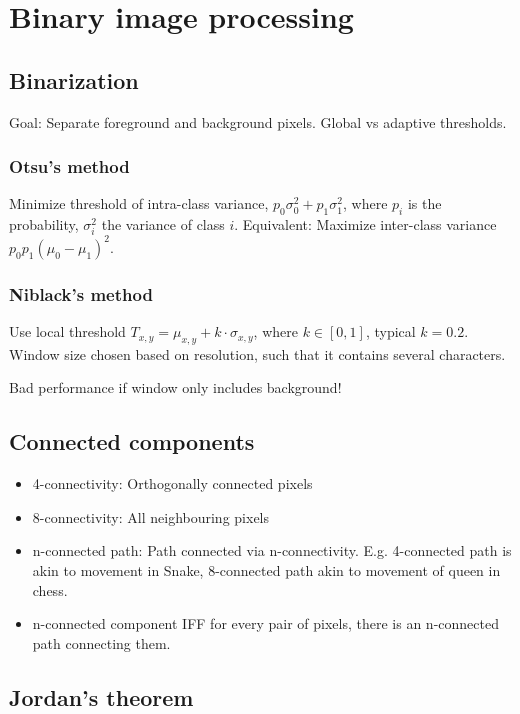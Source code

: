 \section{Binary image processing}

\subsection{Binarization}

Goal: Separate foreground and background pixels. Global vs adaptive thresholds.

\subsubsection{Otsu's method}

Minimize threshold of intra-class variance, $p_0 \sigma_0^2 + p_1 \sigma_1^2$,
where $p_i$ is the probability, $\sigma_i^2$ the variance of class $i$.
Equivalent: Maximize inter-class variance $p_0 p_1 (\mu_0 - \mu_1)^2$.

\subsubsection{Niblack's method}

Use local threshold $T_{x, y} = \mu_{x, y} + k \cdot \sigma_{x, y}$, where $k
\in [0, 1]$, typical $k = 0.2$. Window size chosen based on resolution, such
that it contains several characters.

Bad performance if window only includes background!

\subsection{Connected components}

\begin{itemize}
		\item 4-connectivity: Orthogonally connected pixels
		\item 8-connectivity: All neighbouring pixels
		\item n-connected path: Path connected via n-connectivity. E.g.
				4-connected path is akin to movement in Snake, 8-connected path
				akin to movement of queen in chess.
		\item n-connected component IFF for every pair of pixels, there is an
				n-connected path connecting them.
\end{itemize}

\subsection{Jordan's theorem}

